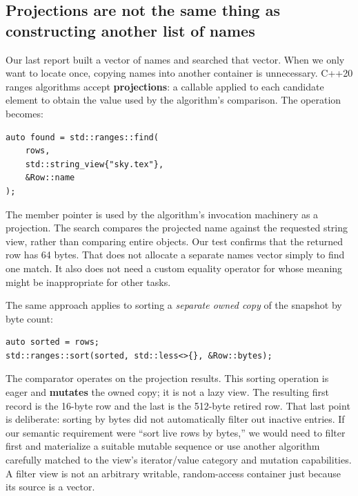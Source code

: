 \subsection{Projections are not the same thing as constructing another list of names}\label{05-engine-i-ch006-projections-are-not-the-same-thing-as-constructing-another-list-of-names}

\hypertarget{05-engine-i-ch006-projections-are-not-the-same-thing-as-constructing-another-list-of-names}{}

Our last report built a vector of names and searched that vector. When we only want to locate  once, copying names into another container is unnecessary. C++20 ranges algorithms accept \textbf{projections}: a callable applied to each candidate element to obtain the value used by the algorithm's comparison. The operation becomes:

\begin{verbatim}
auto found = std::ranges::find(
    rows,
    std::string_view{"sky.tex"},
    &Row::name
);
\end{verbatim}

The member pointer  is used by the algorithm's invocation machinery as a projection. The search compares the projected name against the requested string view, rather than comparing entire  objects. Our test confirms that the returned row has 64 bytes. That does not allocate a separate names vector simply to find one match. It also does not need a custom equality operator for  whose meaning might be inappropriate for other tasks.

The same approach applies to sorting a \emph{separate owned copy} of the snapshot by byte count:

\begin{verbatim}
auto sorted = rows;
std::ranges::sort(sorted, std::less<>{}, &Row::bytes);
\end{verbatim}

The comparator operates on the projection results. This sorting operation is eager and \textbf{mutates} the owned copy; it is not a lazy view. The resulting first record is the 16-byte row and the last is the 512-byte retired row. That last point is deliberate: sorting by bytes did not automatically filter out inactive entries. If our semantic requirement were ``sort live rows by bytes,'' we would need to filter first and materialize a suitable mutable sequence or use another algorithm carefully matched to the view's iterator/value category and mutation capabilities. A filter view is not an arbitrary writable, random-access container just because its source is a vector.

